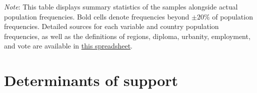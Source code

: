 \begin{table}[h!]
    \caption[Sample representativeness in JP, RU, SA, US]{Sample representativeness in non-European countries. %
    } \label{tab:representativeness_3}
    \makebox[\textwidth][c]{\resizebox*{!}{.78\textheight}{}}
    {\footnotesize \textit{Note}: This table displays summary statistics of the samples alongside actual population frequencies. Bold cells denote frequencies beyond $\pm 20\%$ of population frequencies. 
    Detailed sources for each variable and country population frequencies, as well as the definitions of regions, diploma, urbanity, employment, and vote are available in \href{https://github.com/bixiou/robustness_global_redistr/raw/main/questionnaire/sources.xlsx}{this spreadsheet}. 
    } 
\end{table}
\clearpage
\section{Determinants of support}\label{app:determinants}


